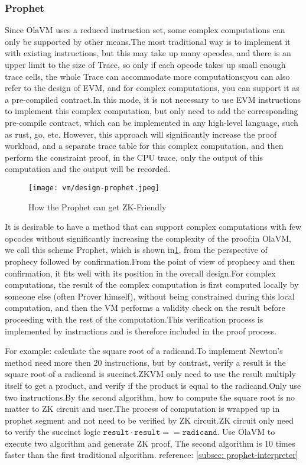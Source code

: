 \subsubsection{Prophet} \label{sec:design-prophet}

Since OlaVM uses a reduced instruction set, some complex computations can only be supported by other means.The most
traditional way is to implement it with existing instructions, but this may take up many opcodes, and there is an upper
limit to the size of Trace, so only if each opcode takes up small enough trace cells, the whole Trace can accommodate more
computations;you can also refer to the design of EVM, and for complex computations, you can support it as a pre-compiled
contract.In this mode, it is not necessary to use EVM instructions to implement this complex computation, but only need
to add the corresponding pre-compile contract, which can be implemented in any high-level language, such as rust, go, etc.
However, this approach will significantly increase the proof workload, and a separate trace table for this complex computation,
and then perform the constraint proof, in the CPU trace, only the output of this computation and the output will be recorded.

\begin{figure}[!ht]
    \centering
    \texttt{[image: vm/design-prophet.jpeg]}
    \caption{How the Prophet can get ZK-Friendly}
    \label{fig:design-prophet}
\end{figure}

It is desirable to have a method that can support complex computations with few opcodes without significantly increasing the
complexity of the proof;in OlaVM, we call this scheme Prophet, which is shown in\ref{fig:design-prophet}, from the perspective
of prophecy followed by confirmation.From the point of view of prophecy and then confirmation, it fits well with its position
in the overall design.For complex computations, the result of the complex computation is first computed locally by someone else
(often Prover himself), without being constrained during this local computation, and then the VM performs a validity check on the
result before proceeding with the rest of the computation.This verification process is implemented by instructions and is therefore
included in the proof process.

For example: calculate the square root of a radicand.To implement Newton's method need more then 20 instructions, but by contrast,
verify a result is the square root of a radicand is succinct.ZKVM only need to use the result multiply itself to get a product, 
and verify if the product is equal to the radicand.Only use two instructions.By the second algorithm, how to compute the square
root is no matter to ZK circuit and user.The process of computation is wrapped up in prophet segment and not need to be verified
by ZK circuit.ZK circuit only need to verify the succinct logic $\texttt{result} \cdot \texttt{result} == \texttt{radicand}$.
Use OlaVM to execute two algorithm and generate ZK proof, The second algorithm is 10 times faster than the first traditional algorithm.
reference: \ref{subsec: prophet-interpreter}

